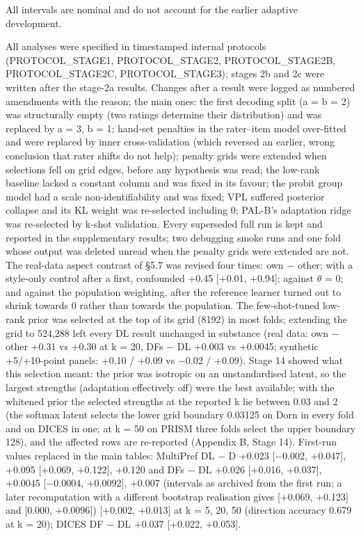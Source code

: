 \documentclass{article}
\begin{document}
All intervals are nominal and do not account for the earlier adaptive development.

All analyses were specified in timestamped internal protocols (PROTOCOL\_STAGE1, PROTOCOL\_STAGE2, PROTOCOL\_STAGE2B, PROTOCOL\_STAGE2C, PROTOCOL\_STAGE3); stages 2b and 2c were written after the stage-2a results. Changes after a result were logged as numbered amendments with the reason; the main ones: the first decoding split (a = b = 2) was structurally empty (two ratings determine their distribution) and was replaced by a = 3, b = 1; hand-set penalties in the rater--item model over-fitted and were replaced by inner cross-validation (which reversed an earlier, wrong conclusion that rater shifts do not help); penalty grids were extended when selections fell on grid edges, before any hypothesis was read; the low-rank baseline lacked a constant column and was fixed in its favour; the probit group model had a scale non-identifiability and was fixed; VPL suffered posterior collapse and its KL weight was re-selected including 0; PAL-B's adaptation ridge was re-selected by k-shot validation. Every superseded full run is kept and reported in the supplementary results; two debugging smoke runs and one fold whose output was deleted unread when the penalty grids were extended are not. The real-data aspect contrast of \S{}5.7 was revised four times: own $-$ other; with a style-only control after a first, confounded +0.45 {[}+0.01, +0.94{]}; against $\theta$ = 0; and against the population weighting, after the reference learner turned out to shrink towards 0 rather than towards the population. The few-shot-tuned low-rank prior was selected at the top of its grid (8192) in most folds; extending the grid to 524,288 left every DL result unchanged in substance (real data: own $-$ other +0.31 vs +0.30 at k = 20, DFs $-$ DL +0.003 vs +0.0045; synthetic +5/+10-point panels: +0.10 / +0.09 vs $-$0.02 / +0.09). Stage 14 showed what this selection meant: the prior was isotropic on an unstandardised latent, so the largest strengths (adaptation effectively off) were the best available; with the whitened prior the selected strengths at the reported k lie between 0.03 and 2 (the softmax latent selects the lower grid boundary 0.03125 on Dorn in every fold and on DICES in one; at k = 50 on PRISM three folds select the upper boundary 128), and the affected rows are re-reported (Appendix B, Stage 14). First-run values replaced in the main tables: MultiPref DL $-$ D +0.023 {[}$-$0.002, +0.047{]}, +0.095 {[}+0.069, +0.122{]}, +0.120 and DFs $-$ DL +0.026 {[}+0.016, +0.037{]}, +0.0045 {[}$-$0.0004, +0.0092{]}, +0.007 (intervals as archived from the first run; a later recomputation with a different bootstrap realisation gives {[}+0.069, +0.123{]} and {[}0.000, +0.0096{]}) {[}+0.002, +0.013{]} at k = 5, 20, 50 (direction accuracy 0.679 at k = 20); DICES DF $-$ DL +0.037 {[}+0.022, +0.053{]}.
\end{document}
